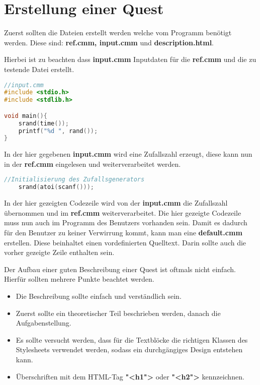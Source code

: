 \section{Erstellung einer Quest}
Zuerst sollten die Dateien erstellt werden welche vom Programm benötigt werden. Diese sind: \textbf{ref.cmm, input.cmm} und \textbf{description.html}.

Hierbei ist zu beachten dass \textbf{input.cmm} Inputdaten für die \textbf{ref.cmm} und die zu testende Datei erstellt.
\begin{lstlisting}[language=C]
//input.cmm
#include <stdio.h>
#include <stdlib.h>

void main(){
	srand(time());
	printf("%d ", rand());	
}

\end{lstlisting}
In der hier gegebenen \textbf{input.cmm} wird eine Zufallszahl erzeugt, diese kann nun in der \textbf{ref.cmm} eingelesen und weiterverarbeitet werden. 
\begin{lstlisting}[language=C]
	//Initialisierung des Zufallsgenerators
	srand(atoi(scanf()));
\end{lstlisting}
In der hier gezeigten Codezeile wird von der \textbf{input.cmm} die Zufallszahl übernommen und im \textbf{ref.cmm} weiterverarbeitet. Die hier gezeigte Codezeile muss nun auch im Programm des Benutzers vorhanden sein. Damit es dadurch für den Benutzer zu keiner Verwirrung kommt, kann man eine \textbf{default.cmm} erstellen. Diese beinhaltet einen vordefinierten Quelltext. Darin sollte auch die vorher gezeigte Zeile enthalten sein.

Der Aufbau einer guten Beschreibung einer Quest ist oftmals nicht einfach. Hierfür sollten mehrere Punkte beachtet werden. 

\begin{itemize}
\item Die Beschreibung sollte einfach und verständlich sein. 
\item Zuerst sollte ein theoretischer Teil beschrieben werden, danach die Aufgabenstellung.
\item Es sollte versucht werden, dass für die Textblöcke die richtigen Klassen des Stylesheets verwendet werden, sodass ein durchgängiges Design entstehen kann.
\item Überschriften mit dem HTML-Tag \textbf{"<h1">} oder \textbf{"<h2">} kennzeichnen.
\end{itemize}